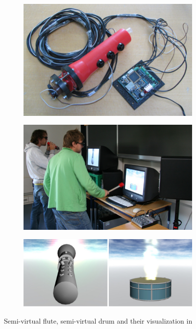 \begin{figure}[ht]
	\centering
	\begin{subfigure}{0.32\textwidth}
		\centering
		\includegraphics[width=\textwidth]{images/related-work/semi-virtual-flute}
	\end{subfigure}
	\hfill
	\begin{subfigure}{0.32\textwidth}
		\centering
		\includegraphics[width=\textwidth]{images/related-work/semi-virtual-drum}
	\end{subfigure}
	\hfill
	\begin{subfigure}{0.32\textwidth}
		\centering
		\includegraphics[width=\textwidth]{images/related-work/semi-virtual-visualization}
	\end{subfigure}
	\caption{Semi-virtual flute, semi-virtual drum and their visualization in~\protect\cite{semi-virtual-instruments}}
	\label{fig:semi-virtual}
\end{figure}

